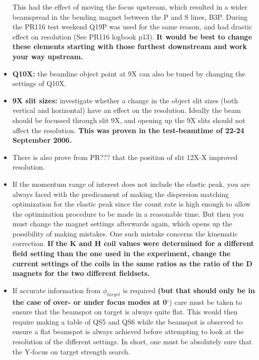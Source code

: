 \documentclass[11pt]{report}
\begin{document}
\begin{itemize}
      This had the effect of moving the focus upstream, which resulted
      in a wider beamspread in the bending magnet between the P and S lines, B3P.
      During the PR116 test weekend Q19P was used for the same reason, and
      had drastic effect on resolution (See PR116 logbook p13).
      {\bf It would be best to change these elements starting with those furthest downstream and
	work your way upstream.}
\item {\bf Q10X:} the beamline object point at 9X can also be tuned by changing the settings of
      Q10X. 
\item {\bf 9X slit sizes:} investigate whether a change in the object slit sizes (both vertical
      and horizontal) have an effect on the resolution. Ideally the 
      beam should be focussed through slit 9X, and opening up the 9X slits
      should not affect the resolution. 
      {\bf This was proven in the test-beamtime of 22-24 September 2006.}
\item There is also prove from PR??? that the position of slit 12X-X improved resolution.
\item If the momentum range of interest does not include the elastic peak,
      you are always faced with the predicament of making the dispersion matching
      optimization for the elastic peak since the count rate is high enough to allow
      the optimization procedure to be made in a reasonable time.
      But then you must change the magnet settings afterwards again, which opens up
      the possibility of making mistakes. One such mistake concerns the kinematic correction.
      {\bf If the K and H coil values were determined for a different field
      setting than the one used in the experiment, change the current
      settings of the coils in the same ratios as the ratio of the D magnets
      for the two different fieldsets.}
\item If accurate information from $\phi_{target}$ is required 
      {\bf (but that should only be in the case of over- or under focus modes at 
      0$^{\circ}$}) 
      care must be taken to ensure that the beamspot on target is always
      quite flat. This would then require making a table of QS5 and QS6 
      while the beamspot is observed to ensure 
      a flat beamspot is always achieved before attempting to look at
      the resolution of the different settings.
      In short, one must be absolutely sure that the Y-focus on target strength search.




\end{itemize}
\end{document}
